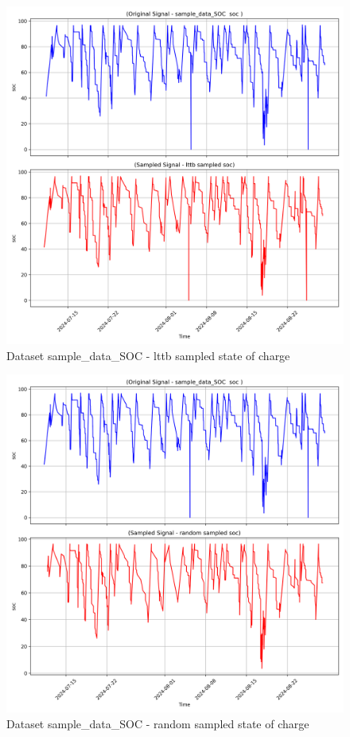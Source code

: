 \begin{figure}
    \centering
    \includegraphics[width=1\linewidth]{screenshots/sample_data_SOC/lttb_sampled_soc_screenshot.png}
    \caption{Dataset sample\_data\_SOC - lttb sampled state of charge }
    \label{fig:sample_data_SOC_lttb_sampled_soc_screenshot}
\end{figure}
\begin{figure}
    \centering
    \includegraphics[width=1\linewidth]{screenshots/sample_data_SOC/random_sampled_soc_screenshot.png}
    \caption{Dataset sample\_data\_SOC - random sampled state of charge }
    \label{fig:sample_data_SOC_random_sampled_soc_screenshot}
\end{figure}
